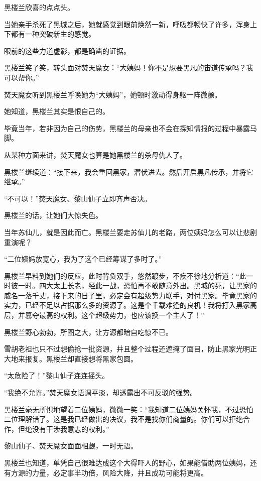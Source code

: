 \begin{this_body}
黑楼兰欣喜的点点头。

当她亲手杀死了黑城之后，她就感觉到眼前焕然一新，呼吸都畅快了许多，浑身上下都有一种突破新生的感觉。

眼前的这些力道虚影，都是确凿的证据。

黑楼兰笑了笑，转头面对焚天魔女：“大姨妈！你不是想要黑凡的宙道传承吗？我可以帮你。”

焚天魔女听到黑楼兰呼唤她为“大姨妈”，她顿时激动得身躯一阵微颤。

她知道，黑楼兰其实是恨自己的。

毕竟当年，若非因为自己的伤势，黑楼兰的母亲也不会在探知情报的过程中暴露马脚。

从某种方面来讲，焚天魔女也算是她黑楼兰的杀母仇人了。

黑楼兰继续道：“接下来，我会重回黑家，潜伏进去。然后开启黑凡传承，并将它继承。”

“不可以！”焚天魔女、黎山仙子立即齐声否决。

黑楼兰的话，让她们大惊失色。

当年苏仙儿，就是因此而亡。黑楼兰要走苏仙儿的老路，两位姨妈怎么可以让悲剧重演呢？

“二位姨妈放宽心，我为了这个已经筹谋了多时了。”

黑楼兰早料到她们的反应，此时背负双手，悠然踱步，不疾不徐地分析道：“此一时彼一时。四大太上长老，经此一战，恐怕再不敢随意外出。黑城的死，让黑家的威名一落千丈，接下来的日子里，必定会有超级势力联手，对付黑家。毕竟黑家的实力，已经不足以占据那么多的资源了。这是个千载难逢的良机！我将打入黑家高层，并篡夺最高的权利。这个超级势力，也应该换一个主人了！”

黑楼兰野心勃勃，所图之大，让方源都暗自吃惊不已。

雪胡老祖也只不过想偷抢一批资源，并且整个过程还遮掩了面目，防止黑家光明正大地来报复。黑楼兰却直接想将黑家包圆。

“太危险了！”黎山仙子连连摇头。

“我绝不允许。”焚天魔女语调平淡，却透露出不可反驳的强势。

黑楼兰毫无所惧地望着二位姨妈，微微一笑：“我知道二位姨妈关怀我，不过恐怕二位理解错了。这是我已经做出的决议，我不是找你们商量的。你们可以拒绝合作，但绝没有干涉我意志的权利。”

黎山仙子、焚天魔女面面相觑，一时无语。

黑楼兰也知道，单凭自己很难达成这个大得吓人的野心，如果能借助两位姨妈，还有方源的力量，必定事半功倍，风险大降，并且成功可能将更高。


\end{this_body}

